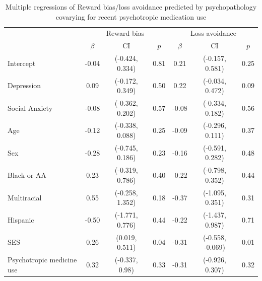 \documentclass[english,man,floatsintext]{apa6}
\begin{document}
\begin{table}[tbp]
\begin{center}
\begin{threeparttable}
\end{threeparttable}
\end{center}

\end{table}

\begin{table}[tbp]

\begin{center}
\begin{threeparttable}

\caption{\label{tab:unnamed-chunk-11}Multiple regressions of Reward bias/loss avoidance predicted by psychopathology covarying for recent psychotropic medication use}

\begin{tabular}{lcccccc}
\toprule
 \multicolumn{1}{c}{ } & \multicolumn{3}{c}{Reward bias} & \multicolumn{3}{c}{Loss avoidance} \\
\cmidrule(r){1-1} \cmidrule(r){2-4} \cmidrule(r){5-7}
  & $\beta$ & CI & $p$ & $\beta$ & CI & $p$\\
\midrule
Intercept & -0.04 & (-0.424, 0.334) & 0.81 & 0.21 & (-0.157, 0.581) & 0.25\\
Depression & 0.09 & (-0.172, 0.349) & 0.50 & 0.22 & (-0.034, 0.472) & 0.09\\
Social Anxiety & -0.08 & (-0.362, 0.202) & 0.57 & -0.08 & (-0.334, 0.182) & 0.56\\
Age & -0.12 & (-0.338, 0.088) & 0.25 & -0.09 & (-0.296, 0.111) & 0.37\\
Sex & -0.28 & (-0.745, 0.186) & 0.23 & -0.16 & (-0.591, 0.282) & 0.48\\
Black or AA & 0.23 & (-0.319, 0.786) & 0.40 & -0.22 & (-0.798, 0.352) & 0.44\\
Multiracial & 0.55 & (-0.258, 1.352) & 0.18 & -0.37 & (-1.095, 0.351) & 0.31\\
Hispanic & -0.50 & (-1.771, 0.776) & 0.44 & -0.22 & (-1.437, 0.987) & 0.71\\
SES & 0.26 & (0.019, 0.511) & 0.04 & -0.31 & (-0.558, -0.069) & 0.01\\
Psychotropic medicine use & 0.32 & (-0.337, 0.98) & 0.33 & -0.31 & (-0.926, 0.307) & 0.32\\
\bottomrule
\end{tabular}

\end{threeparttable}
\end{center}

\end{table}
\end{document}
